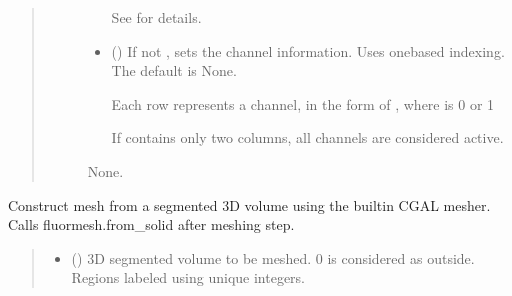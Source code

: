 \documentclass[letterpaper,10pt,english]{sphinxmanual}
\begin{document}
\begin{fulllineitems}
\begin{fulllineitems}
\begin{quote}
\begin{description}
\begin{itemize}
\sphinxAtStartPar
See {\hyperref[\detokenize{_autosummary/nirfasterff.base.optodes.optode:nirfasterff.base.optodes.optode.touch_detectors}]{}} for details.


\item {} 
\sphinxAtStartPar
{} (\sphinxstyleliteralemphasis{\sphinxupquote{, }}) \textendash{} 
\sphinxAtStartPar
If not , sets the channel information. Uses one\sphinxhyphen{}based indexing. The default is None.

\sphinxAtStartPar
Each row represents a channel, in the form of , where  is 0 or 1

\sphinxAtStartPar
If  contains only two columns, all channels are considered active.


\end{itemize}

\sphinxAtStartPar
None.

\end{description}\end{quote}

\end{fulllineitems}


\begin{fulllineitems}
\label{\detokenize{_autosummary/nirfasterff.base.fluor_mesh.fluormesh:nirfasterff.base.fluor_mesh.fluormesh.from_volume}}
\pysigstartsignatures
\pysiglinewithargsret
{}
{\sphinxparamcomma {}\sphinxparamcomma {}\sphinxparamcomma {}\sphinxparamcomma {}\sphinxparamcomma {}}
{}
\pysigstopsignatures
\sphinxAtStartPar
Construct mesh from a segmented 3D volume using the built\sphinxhyphen{}in CGAL mesher. Calls fluormesh.from\_solid after meshing step.
\begin{quote}\begin{description}
\begin{itemize}
\item {} 
\sphinxAtStartPar
{} () \textendash{} 3D segmented volume to be meshed. 0 is considered as outside. Regions labeled using unique integers.


\end{itemize}
\end{description}
\end{quote}
\end{fulllineitems}
\end{fulllineitems}
\end{document}
